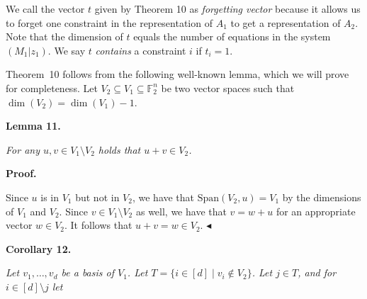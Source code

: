 \documentclass[10pt,a4paper]{article}
\begin{document}



We call the vector $t$ given by Theorem 10 as \emph{forgetting vector} because it allows us to forget one constraint in the representation of $A_{1}$ to get a representation of $A_{2}$.
Note that the dimension of $t$ equals the number of equations in the system $(M_{1}|z_{1})$.
We say $t$ \emph{contains} a constraint $i$ if $t_{i}=1$.\par




Theorem 10 follows from the following well-known lemma, which we will prove for completeness.
Let $V_{2}\subseteq V_{1}\subseteq\mathbb{F}_{2}^{n}$ be two vector spaces such that $\dim(V_{2})=\dim(V_{1})-1$.\par





\par\medskip\noindent\textbf{
\textbf{Lemma 11}\textbf{.}
}\par



\emph{For any $u,v\in V_{1}\setminus V_{2}$ holds that $u+v\in V_{2}$.}\par






\par\medskip\noindent\textbf{Proof.}\par




Since $u$ is in $V_{1}$ but not in $V_{2}$, we have that $\text{Span}(V_{2},u)=V_{1}$ by the dimensions of $V_{1}$ and $V_{2}$.
Since $v\in V_{1}\setminus V_{2}$ as well, we have that $v=w+u$ for an appropriate vector $w\in V_{2}$.
It follows that $u+v=w\in V_{2}$.
$\blacktriangleleft$\par





\par\medskip\noindent\textbf{
\textbf{Corollary 12}\textbf{.}
}\par



\emph{Let $v_{1},\dots,v_{d}$ be a basis of $V_{1}$.
Let $T=\{i\in[d]\mid v_{i}\not\in V_{2}\}$.
Let $j\in T$, and for $i\in[d]\setminus j$ let}\par
\end{document}
